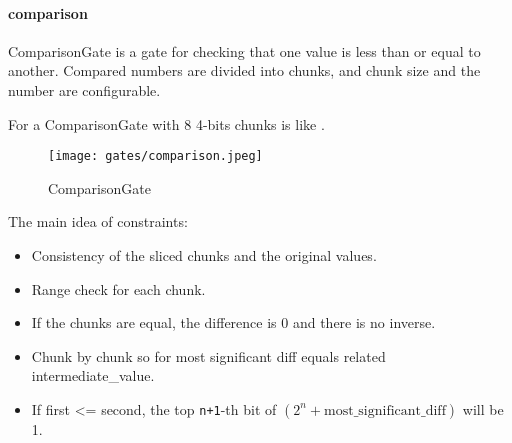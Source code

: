 \paragraph{comparison}

\hspace*{\fill}

\indent ComparisonGate is a gate for checking that one value is less than or equal to another. 
Compared numbers are divided into chunks, and chunk size and the number are configurable.

For a ComparisonGate with 8 4-bits chunks is like .

\begin{figure}[!ht]
    \centering
    \texttt{[image: gates/comparison.jpeg]}
    \caption{ComparisonGate}
    \label{fig:comparison}
\end{figure}

The main idea of constraints:
\begin{itemize}
    \item Consistency of the sliced chunks and the original values.
    \item Range check for each chunk.
    \item If the chunks are equal, the difference is 0 and there is no inverse.
    \item Chunk by chunk so for most significant diff equals related intermediate\_value.
    \item If first <= second, the top \verb|n+1|-th bit of $(2^n + \text{most\_significant\_diff})$ will be 1.
\end{itemize}
